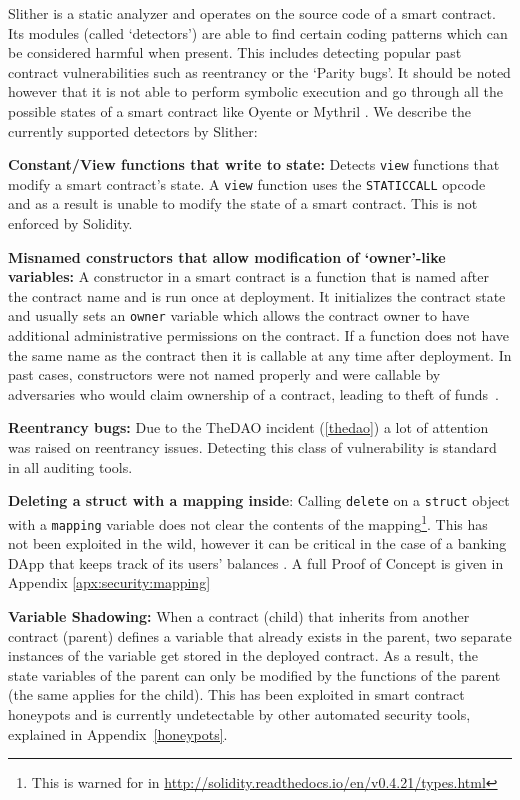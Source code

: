 Slither is a static analyzer and operates on the source code of a smart contract. Its modules (called `detectors') are able to find certain coding patterns which can be considered harmful when present. This includes detecting popular past contract vulnerabilities such as reentrancy or the `Parity bugs'. It should be noted however that it is not able to perform symbolic execution and go through all the possible states of a smart contract like Oyente or Mythril \cite{Luu:2016:MSC:2976749.2978309, mythril}. We describe the currently supported detectors by Slither:

\textbf{Constant/View functions that write to state:} Detects \texttt{view} functions that modify a smart contract's state. A \texttt{view} function uses the \texttt{STATICCALL} opcode and as a result is unable to modify the state of a smart contract\cite{staticcall}. This is not enforced by Solidity.

\textbf{Misnamed constructors that allow modification of `owner'-like variables:} A constructor in a smart contract is a function that is named after the contract name and is run once at deployment. It initializes the contract state and usually sets an \texttt{owner} variable which allows the contract owner to have additional administrative permissions on the contract. If a function does not have the same name as the contract then it is callable at any time after deployment. In past cases, constructors were not named properly and were callable by adversaries who would claim ownership of a contract, leading to theft of funds~\cite{Atzei:2017:SAE:3080353.3080363}.

\textbf{Reentrancy bugs:} Due to the TheDAO incident (\ref{thedao}) a lot of attention was raised on reentrancy issues. Detecting this class of vulnerability is standard in all auditing tools.

\textbf{Deleting a struct with a mapping inside}: Calling \texttt{delete} on a \texttt{struct} object with a \texttt{mapping} variable does not clear the contents of the mapping\footnote{This is warned for in \url{http://solidity.readthedocs.io/en/v0.4.21/types.html}}. This has not been exploited in the wild, however it can be critical in the case of a banking DApp that keeps track of its users' balances . A full Proof of Concept is given in Appendix \ref{apx:security:mapping}

\textbf{Variable Shadowing:} When a contract (child) that inherits from another contract (parent) defines a variable that already exists in the parent, two separate instances of the variable get stored in the deployed contract. As a result, the state variables of the parent can only be modified by the functions of the parent (the same applies for the child). This has been exploited in smart contract honeypots and is currently undetectable by other automated security tools, explained in Appendix~\ref{honeypots}.

